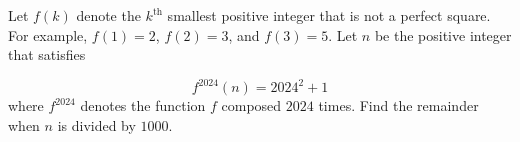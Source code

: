 Let $f(k)$ denote the $k^{\text{th}}$ smallest positive integer that is not a perfect square. For example, $f(1)=2$, $f(2)=3$, and $f(3)=5$. Let $n$ be the positive integer that satisfies

$$f^{2024}(n)=2024^2+1$$where $f^{2024}$ denotes the function $f$ composed $2024$ times. Find the remainder when $n$ is divided by $1000$.
